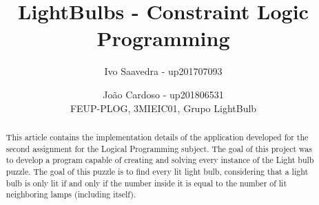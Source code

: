 \documentclass[runningheads]{llncs}
\begin{document}
%
\title{LightBulbs - Constraint Logic Programming}
%
%
\author{Ivo Saavedra - up201707093\and
João Cardoso - up201806531 \\
\small{FEUP-PLOG, 3MIEIC01, Grupo LightBulb}}

%
\authorrunning{ }
%
%
\maketitle              %
%
\begin{abstract}
This article contains the implementation details of the application developed for the second assignment for the
Logical Programming subject. The goal of this project was to develop a program capable of creating and solving every instance of the Light bulb puzzle. The goal of this puzzle is to find every lit light bulb, considering that a light bulb is only lit if and only if the number inside it is equal to the number of lit neighboring lamps (including itself).

\end{abstract}
%
%
%
\end{document}
